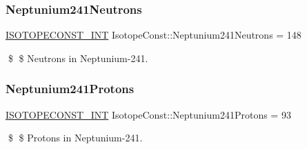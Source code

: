 \subsubsection{\texorpdfstring{Neptunium241\+Neutrons}{Neptunium241Neutrons}}
{\footnotesize\ttfamily \mbox{\hyperlink{group___isotope_const-_macros_ga5f18360b3e99483a35c32d789e62621c}{I\+S\+O\+T\+O\+P\+E\+C\+O\+N\+S\+T\+\_\+\+I\+NT}} Isotope\+Const\+::\+Neptunium241\+Neutrons = 148}

\$ \$ Neutrons in Neptunium-\/241. \mbox{\label{group___isotope_const-_neptunium-_np241_gaeae4bceb8934d25ac1929eb0375b0f65}} 
\subsubsection{\texorpdfstring{Neptunium241\+Protons}{Neptunium241Protons}}
{\footnotesize\ttfamily \mbox{\hyperlink{group___isotope_const-_macros_ga5f18360b3e99483a35c32d789e62621c}{I\+S\+O\+T\+O\+P\+E\+C\+O\+N\+S\+T\+\_\+\+I\+NT}} Isotope\+Const\+::\+Neptunium241\+Protons = 93}

\$ \$ Protons in Neptunium-\/241. 
